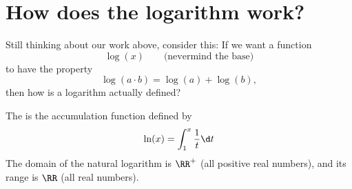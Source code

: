 \documentclass{ximera}
\begin{document}
\section{How does the logarithm work?}

Still thinking about our work above, consider this: If we want a function
\[
\log(x)\qquad\text{(nevermind the base)}
\]
to have the property
\[
\log(a\cdot b) = \log(a) + \log(b),
\]
then how is a logarithm actually defined?

\begin{definition}
  The  is the accumulation function defined by
  \[
  \ln(x) = \int_1^x \frac{1}{t} \d t
  \]
  The domain of the natural logarithm is $\RR^+$ (all positive real numbers),
  and its range is $\RR$ (all real numbers). 
\end{definition}



\end{document}
